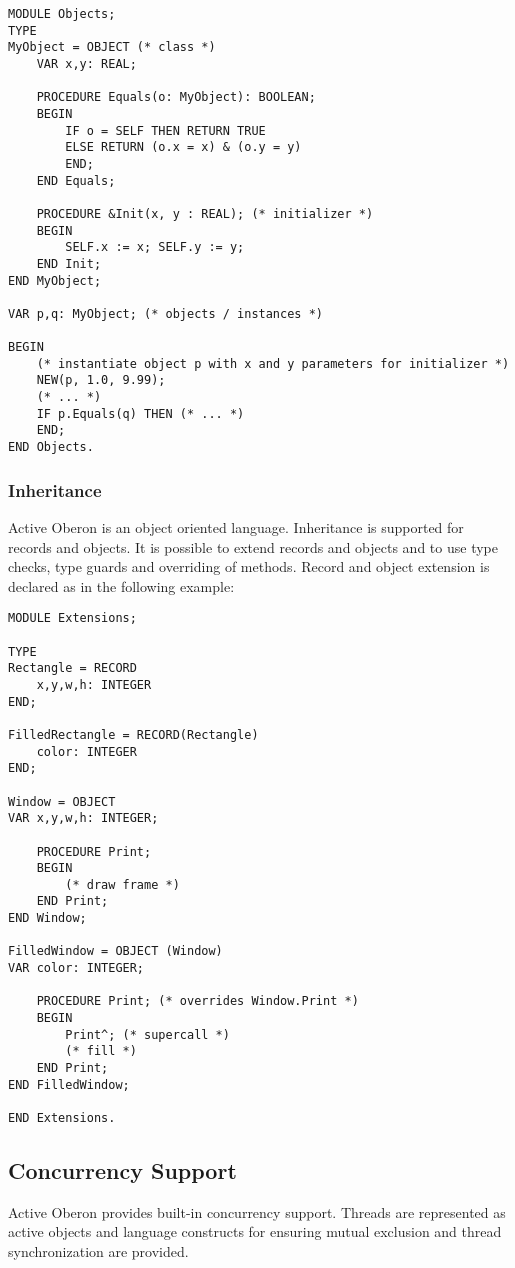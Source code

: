 \documentclass[a4paper,11pt]{article}
\begin{document}
\begin{lstlisting}[language=Oberon,frame=none,caption=Usage of Objects]
MODULE Objects;
TYPE
MyObject = OBJECT (* class *)
    VAR x,y: REAL;

    PROCEDURE Equals(o: MyObject): BOOLEAN;
    BEGIN
        IF o = SELF THEN RETURN TRUE
        ELSE RETURN (o.x = x) & (o.y = y)
        END;
    END Equals;

    PROCEDURE &Init(x, y : REAL); (* initializer *)
    BEGIN
        SELF.x := x; SELF.y := y;
    END Init;
END MyObject;

VAR p,q: MyObject; (* objects / instances *)

BEGIN
    (* instantiate object p with x and y parameters for initializer *)
    NEW(p, 1.0, 9.99);
    (* ... *)
    IF p.Equals(q) THEN (* ... *)
    END;
END Objects.
\end{lstlisting}

\subsubsection{Inheritance}
Active Oberon is an object oriented language. Inheritance is supported for records and objects. It is possible to extend records and objects and to use type checks, type guards and overriding of methods.
Record and object extension is declared as in the following example:

\begin{lstlisting}[language=Oberon,frame=none,caption=Type extension of records and objects]
MODULE Extensions;

TYPE
Rectangle = RECORD
    x,y,w,h: INTEGER
END;

FilledRectangle = RECORD(Rectangle)
    color: INTEGER
END;

Window = OBJECT
VAR x,y,w,h: INTEGER;

    PROCEDURE Print;
    BEGIN
        (* draw frame *)
    END Print;
END Window;

FilledWindow = OBJECT (Window)
VAR color: INTEGER;

    PROCEDURE Print; (* overrides Window.Print *)
    BEGIN
        Print^; (* supercall *)
        (* fill *)
    END Print;
END FilledWindow;

END Extensions.
\end{lstlisting}

\subsection{Concurrency Support}
Active Oberon provides built-in concurrency support. Threads are represented as active objects and language constructs for ensuring mutual exclusion and thread synchronization are provided.
\end{document}
